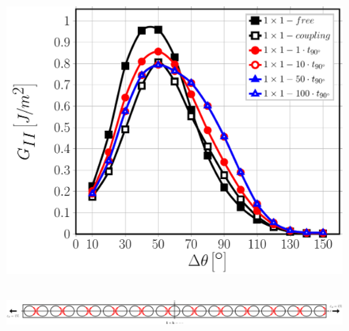 \documentclass[first,firstsupp,lastsupp,last,hyperref,table]{ETHclass}
\begin{document}
\begin{frame}
\begin{columns}[c]
\begin{column}{0.5\textwidth}
\begin{figure}
\includegraphics[width=\columnwidth]{1x1-i-vf60-GII-coupling.pdf}
\end{figure}
\end{column}
\end{columns}
\begin{figure}
\centering
\includegraphics[width=\textwidth]{onefiber-sameside-crackshielding1.pdf}
\end{figure}
\end{frame}

\addtocounter{framenumber}{-1}
\end{document}
